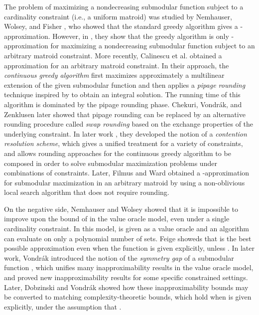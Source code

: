 \documentclass{article}
\theoremstyle{definition}
\begin{document}
The problem of maximizing a nondecreasing submodular function subject to a cardinality constraint (i.e., a uniform matroid) was studied by Nemhauser, Wolsey, and Fisher \cite{Nemhauser1978a}, who showed that the standard greedy algorithm gives a -approximation.  However, in \cite{Fisher1978}, they show that the greedy algorithm is only -approximation for maximizing a nondecreasing submodular function subject to an arbitrary matroid constraint.  More recently, Calinescu et al. \cite{Calinescu2011} obtained a  approximation for an arbitrary matroid constraint.  In their approach, the \emph{continuous greedy algorithm} first maximizes approximately a multilinear extension of the given submodular function and then applies a \emph{pipage rounding} technique inspired by \cite{Ageev2004} to obtain an integral solution.  The running time of this algorithm is dominated by the pipage rounding phase.  Chekuri, Vondr\'{a}k, and Zenklusen \cite{Chekuri2010} later showed that pipage rounding can be replaced by an alternative rounding procedure called \emph{swap rounding} based on the exchange properties of the underlying constraint.  In later work \cite{Chekuri2011,Chekuri2011a}, they developed the notion of a \emph{contention resolution scheme}, which gives a unified treatment for a variety of constraints, and allows rounding approaches for the continuous greedy algorithm to be composed in order to solve submodular maximization problems under combinations of constraints.  Later, Filmus and Ward \cite{Filmus2012} obtained a -approximation for submodular maximization in an arbitrary matroid by using a non-oblivious local search algorithm that does not require rounding.

On the negative side, Nemhauser and Wolsey \cite{Nemhauser1978} showed that it is impossible to improve upon the bound of  in the value oracle model, even under a single cardinality constraint.  In this model,  is given as a value oracle and an algorithm can evaluate  on only a polynomial number of sets.  Feige \cite{Feige1998} showeds that  is the best possible approximation even when the function is given explicitly, unless .  In later work, Vondr\'{a}k \cite{Vondrak2009} introduced the notion of the \emph{symmetry gap} of a submodular function , which unifies many inapproximability results in the value oracle model, and proved new inapproximability results for some specific constrained settings.  Later, Dobzinski and Vondr\'ak \cite{Dobzinski2012} showed how these inapproximability bounds may be converted to matching complexity-theoretic bounds, which hold when  is given explicitly, under the assumption that .
\end{document}
